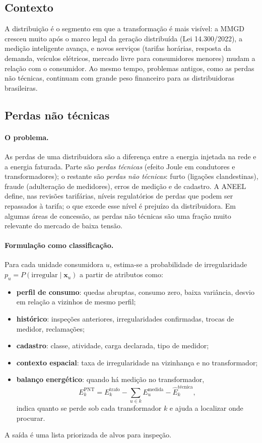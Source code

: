 \documentclass[10pt,a4paper,oneside]{article}
\begin{document}
\subsection{Contexto}

A distribuição é o segmento em que a transformação é mais visível: a
MMGD cresceu muito após o marco legal da geração distribuída (Lei
14.300/2022), a medição inteligente avança, e novos serviços (tarifas
horárias, resposta da demanda, veículos elétricos, mercado livre para
consumidores menores) mudam a relação com o consumidor. Ao mesmo tempo,
problemas antigos, como as perdas não técnicas, continuam com grande peso
financeiro para as distribuidoras brasileiras.

\subsection{Perdas não técnicas}

\paragraph{O problema.} As perdas de uma distribuidora são a diferença entre a
energia injetada na rede e a energia faturada. Parte são \emph{perdas
técnicas} (efeito Joule em condutores e transformadores); o restante são
\emph{perdas não técnicas}: furto (ligações clandestinas), fraude (adulteração
de medidores), erros de medição e de cadastro. A ANEEL define, nas revisões
tarifárias, níveis regulatórios de perdas que podem ser repassados à tarifa;
o que excede esse nível é prejuízo da distribuidora. Em algumas áreas de
concessão, as perdas não técnicas são uma fração muito relevante do mercado
de baixa tensão.

\paragraph{Formulação como classificação.} Para cada unidade consumidora $u$,
estima-se a probabilidade de irregularidade
$p_u = P(\text{irregular} \mid \mathbf{x}_u)$ a partir de atributos como:
\begin{itemize}
  \item \textbf{perfil de consumo}: quedas abruptas, consumo zero, baixa
    variância, desvio em relação a vizinhos de mesmo perfil;
  \item \textbf{histórico}: inspeções anteriores, irregularidades
    confirmadas, trocas de medidor, reclamações;
  \item \textbf{cadastro}: classe, atividade, carga declarada, tipo de
    medidor;
  \item \textbf{contexto espacial}: taxa de irregularidade na vizinhança e no
    transformador;
  \item \textbf{balanço energético}: quando há medição no transformador,
    \begin{equation}
      E^{\text{PNT}}_{k} = E^{\text{trafo}}_{k} - \sum_{u \in k} E^{\text{medida}}_{u}
      - \hat{E}^{\text{técnica}}_{k},
    \end{equation}
    indica quanto se perde sob cada transformador $k$ e ajuda a localizar
    onde procurar.
\end{itemize}
A saída é uma lista priorizada de alvos para inspeção.
\end{document}
